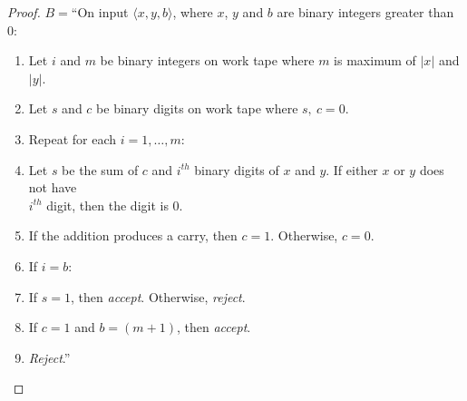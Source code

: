 \documentclass[11pt]{article}
\begin{document}
\begin{proof}
$B =$\textquotedblleft On input $\langle x, y, b \rangle$, where $x$, $y$ and $b$ are binary integers greater than 0:
\begin{enumerate}
\item Let $i$ and $m$ be binary integers on work tape where $m$ is maximum of $|x|$ and $|y|$. 
\item Let $s$ and $c$ be binary digits on work tape where $s, \ c = 0$.
\item Repeat for each $i = 1,\ldots,m$:
\item \hspace*{0.5cm} Let $s$ be the sum of $c$ and $i^{th}$ binary digits of $x$ and $y$. If either $x$ or $y$ does not have \\
\hspace*{0.5cm} $i^{th}$ digit, then the digit is 0.
\item \hspace*{0.5cm} If the addition produces a carry, then $c = 1$. 
Otherwise, $c = 0$.
\item \hspace*{0.5cm} If $i = b$:
\item \hspace*{1.0cm} If $s = 1$, then \textit{accept}.
Otherwise, \textit{reject}.
\item If $c = 1$ and $b = (m+1)$, then \textit{accept}.
\item \textit{Reject}.\textquotedblright
\end{enumerate}

\end{proof}
\end{document}
